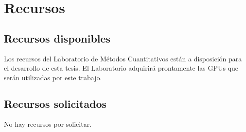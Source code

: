 \documentclass[11pt,spanish]{article}
\begin{document}
\section{Recursos}

\subsection{Recursos disponibles}


Los recursos del Laboratorio de Métodos Cuantitativos
están a disposición para el desarrollo de esta tesis.
El Laboratorio adquirirá prontamente las GPUs que serán utilizadas por
este trabajo.

\subsection{Recursos solicitados}


No hay recursos por solicitar.
\end{document}
